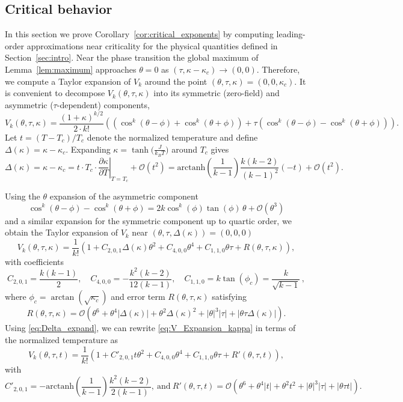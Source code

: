 \documentclass{article}
\numberwithin{theorem}{section}
\theoremstyle{remark}
\begin{document}
\subsection{Critical behavior}
\label{subsec:crit_behavior}
In this section we prove Corollary~\ref{cor:critical_exponents} by computing leading-order approximations near criticality for the physical quantities defined in Section~\ref{sec:intro}. Near the phase transition the global maximum of Lemma~\ref{lem:maximum} approaches $\theta = 0$ as $(\tau, \kappa - \kappa_c) \to (0,0)$. Therefore, we compute a Taylor expansion of $V_k$ around the point $(\theta,\tau,\kappa) = (0,0,\kappa_c)$.
It is convenient to decompose $V_k(\theta, \tau, \kappa)$ into its symmetric (zero-field) and asymmetric ($\tau$-dependent) components,
\[
  V_k(\theta, \tau,\kappa) = \frac{(1+\kappa)^{k/2}}{2\cdot k!} \left( \left( \cos^k(\theta - \phi) + \cos^k(\theta + \phi) \right) + \tau \left( \cos^k(\theta - \phi) - \cos^k(\theta + \phi) \right) \right).
\]
Let $t = (T-T_c)/T_c$ denote the normalized temperature and define $\Delta(\kappa) = \kappa - \kappa_c$. Expanding $\kappa = \tanh\big(\tfrac{J}{k_B T}\big)$ around $T_c$ gives
\begin{equation}
  \label{eq:Delta_expand}
  \Delta(\kappa) = \kappa-\kappa_c = \left. t\cdot T_c \cdot\frac{\partial \kappa}{\partial T} \right|_{T=T_c} + \mathcal{O}(t^2) = \mathrm{arctanh}\left(\frac{1}{k-1}\right) \frac{k(k-2)}{(k-1)^2} (-t) + \mathcal{O}(t^2).
\end{equation}

Using the $\theta$ expansion of the asymmetric component 
\[
  \cos^k(\theta - \phi) - \cos^k(\theta + \phi) = 2k \cos^k(\phi)\tan(\phi) \, \theta + \mathcal{O}(\theta^3)
\]
and a similar expansion for the symmetric component up to quartic order, we obtain the Taylor expansion of $V_k$ near $(\theta,\tau,\Delta(\kappa)) = (0,0,0)$
\begin{equation}
  \label{eq:V_Expansion_kappa}
  V_k(\theta, \tau, \kappa) = \frac1{k!} \left( 1 + C_{2,0,1} \Delta(\kappa)\theta^2 + C_{4,0,0}\theta^4 + C_{1,1,0} \theta\tau + R(\theta,\tau,\kappa) \right),
\end{equation}
with coefficients 
\[
  C_{2,0,1} = \frac{k(k-1)}{2},\quad C_{4,0,0} = -\frac{k^2(k-2)}{12(k-1)},\quad C_{1,1,0} = k \tan(\phi_c) = \frac{k}{\sqrt{k-1}}\,,
\]
where $\phi_c = \arctan(\sqrt{\kappa_c})$ 
and error term $R(\theta,\tau,\kappa)$ satisfying
\[
  R(\theta,\tau,\kappa) = \mathcal{O}\left(
    \theta^6 + \theta^4 |\Delta(\kappa)| + \theta^2\Delta(\kappa)^2 + |\theta|^3|\tau| + 
    |\theta \tau \Delta(\kappa)|
  \right).
\]
Using \eqref{eq:Delta_expand}, we can rewrite \eqref{eq:V_Expansion_kappa} in terms of the normalized temperature as 
\begin{equation}
  \label{eq:V_Expansion}
  V_k(\theta, \tau, t) = \frac1{k!} \left( 1 + C'_{2,0,1} t \theta^2 + C_{4,0,0}\theta^4 + C_{1,1,0} \theta\tau + R'(\theta,\tau,t) \right),
\end{equation}
with
\[
  C'_{2,0,1} = -\mathrm{arctanh}\left( \frac{1}{k-1} \right) \frac{k^2 (k-2)}{2(k-1)},~ \text{and}~  R'(\theta,\tau,t) = \mathcal{O}\left(
    \theta^6 +  \theta^4 |t| + \theta^2 t^2 + | \theta|^3|\tau| + |\theta\tau t|
  \right).
\]
\end{document}
